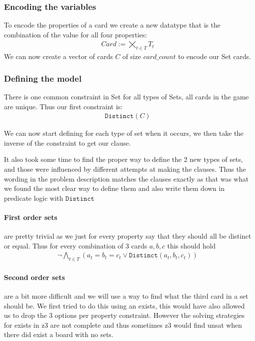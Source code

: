 \documentclass[12pt]{scrartcl}
\newcommand{\mtt}[1]{\ensuremath{\mathtt{#1}}}
\begin{document}
\subsubsection{Encoding the variables}
To encode the properties of a card we create a new datatype that is the combination of the value for all four properties:
\begin{align*}
    Card := \bigtimes_{t\in T} T_t
\end{align*}
We can now create a vector of cards $C$ of size $card\_count$ to encode our Set cards.

\subsubsection{Defining the model}
There is one common constraint in Set for all types of Sets, all cards in the game are unique. Thus our first constraint is:
\begin{align*}
    \mtt{Distinct}(C)
\end{align*}

We can now start defining for each type of set when it occurs, we then take the inverse of the constraint to get our clause. 

It also took some time to find the proper way to define the 2 new types of sets, and those were influenced by different attempts at making the clauses. Thus the wording in the problem description matches the clauses exactly as that was what we found the most clear way to define them and also write them down in predicate logic with \mtt{Distinct}

\paragraph{First order sets}
are pretty trivial as we just for every property say that they should all be distinct or equal. Thus for every combination of 3 cards $a, b, c$ this should hold
\begin{align*}
    \neg \bigwedge_{t\in T} \left( a_t = b_t = c_t \vee \mtt{Distinct}(a_t, b_t, c_t)\right)
\end{align*}

\paragraph{Second order sets}
are a bit more difficult and we will use a way to find what the third card in a set should be. We first tried to do this using an exists, this would have also allowed us to drop the 3 options per property constraint. However the solving strategies for exists in z3 are not complete and thus sometimes z3 would find unsat when there did exist a board with no sets.
\end{document}
